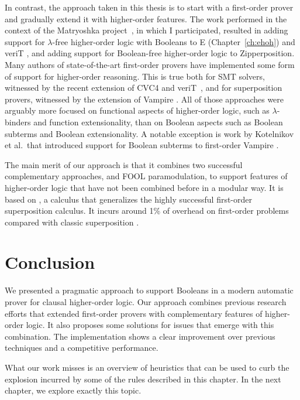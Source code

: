 In contrast, the approach taken in this thesis is to start with a first-order prover and gradually extend it
with higher-order features. The work performed in the context of the Matryoshka project~\cite{matryoshka}, 
in which I participated, resulted in adding support for
$\lambda$-free higher-order logic with Booleans to E (Chapter~\ref{ch:ehoh})
and veriT \cite{cbetal-11-cvc4}, and adding support for Boolean-free higher-order
logic to Zipperposition. Many authors of state-of-the-art
first-order provers have implemented some form of support for higher-order reasoning. This
is true both for SMT solvers, witnessed by the recent extension of CVC4 and veriT~\cite{cbetal-11-cvc4},
 and for superposition provers, witnessed
by the extension of Vampire \cite{br-19-restricted-unif}. All of those approaches were
arguably more focused on functional aspects of higher-order logic, such as
$\lambda$-binders and function extensionality, than on Boolean aspects such as
Boolean subterms and Boolean extensionality. A notable exception is work by
Kotelnikov et al.\ that introduced support for Boolean subterms to first-order
Vampire \cite{kotelnikov-15-fool,kotelnikov-16-fool}.

The main merit of our approach is that it combines two successful complementary
approaches, \lsup{} and FOOL paramodulation, to support features of higher-order logic that have not been combined
before in a modular way. It is based on \lsup{}, a calculus that generalizes the highly successful first-order superposition calculus.
It incurs around 1\% of overhead on first-order problems compared with classic
superposition \cite{bbtvw-21-sup-lam}.

\section{Conclusion} 
\label{sect:bool:conclusion}

We presented a pragmatic approach to support Booleans in a modern automatic prover
for clausal higher-order logic. Our approach combines
previous research efforts that extended first-order provers with complementary
features of higher-order logic. It also proposes some solutions for issues that
emerge with this combination. The implementation shows a clear improvement over previous
techniques and a competitive performance.

What our work misses is an overview of heuristics that can be used to curb the
explosion incurred by some of the rules described in this chapter. In the next chapter,
we explore exactly this topic.



